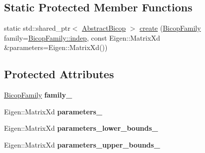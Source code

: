\subsection*{Static Protected Member Functions}
{\bf }\par
\begin{DoxyCompactItemize}
\item 
static std\+::shared\+\_\+ptr$<$ \hyperlink{classvinecopulib_1_1_abstract_bicop}{Abstract\+Bicop} $>$ \hyperlink{classvinecopulib_1_1_abstract_bicop_afefe048baabaa8cd14e849e66a45c428}{create} (\hyperlink{namespacevinecopulib_a42e95cc06d33896199caab0c11ad44f3}{Bicop\+Family} family=\hyperlink{namespacevinecopulib_a42e95cc06d33896199caab0c11ad44f3af49b022096e968010a7b9bd941805a65}{Bicop\+Family\+::indep}, const Eigen\+::\+Matrix\+Xd \&parameters=Eigen\+::\+Matrix\+Xd())
\end{DoxyCompactItemize}

\subsection*{Protected Attributes}
\begin{DoxyCompactItemize}
\item 
\hyperlink{namespacevinecopulib_a42e95cc06d33896199caab0c11ad44f3}{Bicop\+Family} {\bfseries family\+\_\+}\hypertarget{classvinecopulib_1_1_abstract_bicop_a0b731d28eefd359b1e15951d5e58f093}{}\label{classvinecopulib_1_1_abstract_bicop_a0b731d28eefd359b1e15951d5e58f093}

\item 
Eigen\+::\+Matrix\+Xd {\bfseries parameters\+\_\+}\hypertarget{classvinecopulib_1_1_abstract_bicop_a38f60d7c268c71bf93cfbb4203724478}{}\label{classvinecopulib_1_1_abstract_bicop_a38f60d7c268c71bf93cfbb4203724478}

\item 
Eigen\+::\+Matrix\+Xd {\bfseries parameters\+\_\+lower\+\_\+bounds\+\_\+}\hypertarget{classvinecopulib_1_1_abstract_bicop_ac35229a8c8ab553321f6e4deba646d58}{}\label{classvinecopulib_1_1_abstract_bicop_ac35229a8c8ab553321f6e4deba646d58}

\item 
Eigen\+::\+Matrix\+Xd {\bfseries parameters\+\_\+upper\+\_\+bounds\+\_\+}\hypertarget{classvinecopulib_1_1_abstract_bicop_aab60ca983aac95c3ead7c07db1d227ee}{}\label{classvinecopulib_1_1_abstract_bicop_aab60ca983aac95c3ead7c07db1d227ee}

\end{DoxyCompactItemize}
